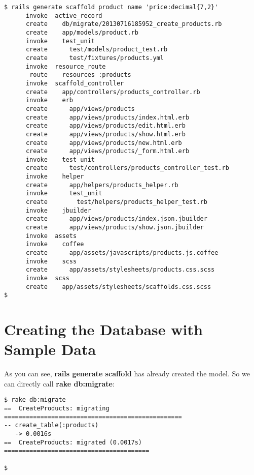 \documentclass[a4paper]{book}
\newcounter{tab}[chapter]
\begin{document}
\begin{shaded}\begin{verbatim}
$ rails generate scaffold product name 'price:decimal{7,2}'
      invoke  active_record
      create    db/migrate/20130716185952_create_products.rb
      create    app/models/product.rb
      invoke    test_unit
      create      test/models/product_test.rb
      create      test/fixtures/products.yml
      invoke  resource_route
       route    resources :products
      invoke  scaffold_controller
      create    app/controllers/products_controller.rb
      invoke    erb
      create      app/views/products
      create      app/views/products/index.html.erb
      create      app/views/products/edit.html.erb
      create      app/views/products/show.html.erb
      create      app/views/products/new.html.erb
      create      app/views/products/_form.html.erb
      invoke    test_unit
      create      test/controllers/products_controller_test.rb
      invoke    helper
      create      app/helpers/products_helper.rb
      invoke      test_unit
      create        test/helpers/products_helper_test.rb
      invoke    jbuilder
      create      app/views/products/index.json.jbuilder
      create      app/views/products/show.json.jbuilder
      invoke  assets
      invoke    coffee
      create      app/assets/javascripts/products.js.coffee
      invoke    scss
      create      app/assets/stylesheets/products.css.scss
      invoke  scss
      create    app/assets/stylesheets/scaffolds.css.scss
$
\end{verbatim}\end{shaded}

\section{Creating the Database with Sample Data}\label{creating-the-database-with-sample-data}

As you can see, \textbf{rails generate scaffold} has already created the model. So we can directly call \textbf{rake db:migrate}:

\begin{shaded}\begin{verbatim}
$ rake db:migrate
==  CreateProducts: migrating =================================================
-- create_table(:products)
   -> 0.0016s
==  CreateProducts: migrated (0.0017s) ========================================

$
\end{verbatim}\end{shaded}
\end{document}
